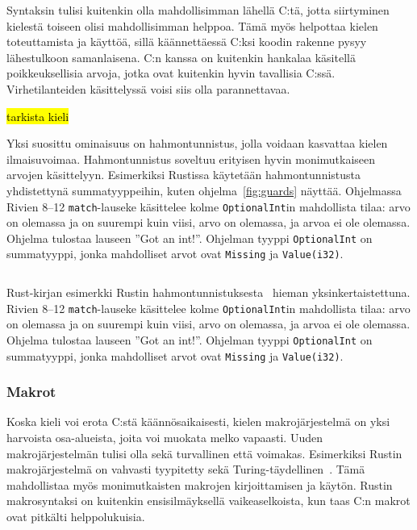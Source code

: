 \FloatBarrier

Syntaksin tulisi kuitenkin olla mahdollisimman lähellä C:tä, jotta siirtyminen
kielestä toiseen olisi mahdollisimman helppoa. Tämä myös helpottaa kielen
toteuttamista ja käyttöä, sillä käännettäessä C:ksi koodin rakenne pysyy
lähestulkoon samanlaisena. C:n kanssa on kuitenkin hankalaa käsitellä
poikkeuksellisia arvoja, jotka ovat kuitenkin hyvin tavallisia C:ssä.
Virhetilanteiden käsittelyssä voisi siis olla parannettavaa.

\newpage

\hl{tarkista kieli}

Yksi suosittu ominaisuus on hahmontunnistus, jolla
voidaan kasvattaa kielen ilmaisuvoimaa. Hahmontunnistus soveltuu erityisen
hyvin monimutkaiseen arvojen käsittelyyn. Esimerkiksi Rustissa käytetään
hahmontunnistusta yhdistettynä summatyyppeihin, kuten ohjelma~\ref{fig:guards}
näyttää. Ohjelmassa Rivien 8--12 \texttt{match}-lauseke käsittelee kolme
\texttt{OptionalInt}in mahdollista tilaa: arvo on olemassa ja on suurempi kuin
viisi, arvo on olemassa, ja arvoa ei ole olemassa. Ohjelma tulostaa lauseen
''Got an int!''. Ohjelman tyyppi \texttt{OptionalInt} on summatyyppi, jonka
mahdolliset arvot ovat \texttt{Missing} ja \texttt{Value(i32)}.

\FloatBarrier

\begin{listing}[ht!]
    \inputminted{Rust}{guards.rs}
    \caption{Rust-kirjan esimerkki Rustin
    hahmontunnistuksesta~\citep{rustguards} hieman yksinkertaistettuna. Rivien
    8--12 \texttt{match}-lauseke käsittelee kolme \texttt{OptionalInt}in
    mahdollista tilaa: arvo on olemassa ja on suurempi kuin viisi, arvo on
    olemassa, ja arvoa ei ole olemassa. Ohjelma tulostaa lauseen ''Got an
    int!''. Ohjelman tyyppi \texttt{OptionalInt} on summatyyppi, jonka
    mahdolliset arvot ovat \texttt{Missing} ja \texttt{Value(i32)}.}
    \label{fig:guards}
\end{listing}

\FloatBarrier

\subsubsection{Makrot}

Koska kieli voi erota C:stä käännösaikaisesti, kielen makrojärjestelmä on yksi
harvoista osa-alueista, joita voi muokata melko vapaasti. Uuden
makrojärjestelmän tulisi olla sekä turvallinen että voimakas. Esimerkiksi
Rustin makrojärjestelmä on vahvasti tyypitetty sekä
Turing-täydellinen~\citep{rustmacros}. Tämä mahdollistaa myös monimutkaisten
makrojen kirjoittamisen ja käytön. Rustin makrosyntaksi on kuitenkin
ensisilmäyksellä vaikeaselkoista, kun taas C:n makrot ovat pitkälti
helppolukuisia.

